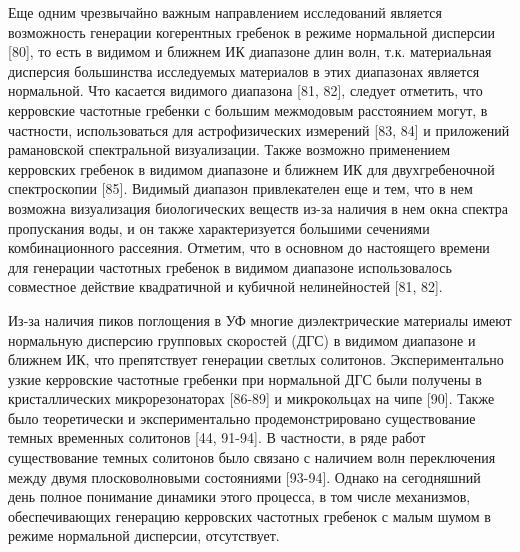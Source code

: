 Еще одним чрезвычайно важным направлением исследований является возможность генерации когерентных гребенок в режиме нормальной дисперсии [80], то есть в видимом и ближнем ИК диапазоне длин волн, т.к. материальная дисперсия большинства исследуемых материалов в этих диапазонах является нормальной. Что касается видимого диапазона [81, 82], следует отметить, что керровские частотные гребенки с большим межмодовым расстоянием могут, в частности, использоваться для астрофизических измерений [83, 84] и приложений рамановской спектральной визуализации. Также возможно применением керровских гребенок в видимом диапазоне и ближнем ИК для двухгребеночной спектроскопии [85]. Видимый диапазон привлекателен еще и тем, что в нем возможна визуализация биологических веществ из-за наличия в нем окна спектра пропускания воды, и он также характеризуется большими сечениями комбинационного рассеяния. Отметим, что в основном до настоящего времени для генерации частотных гребенок в видимом диапазоне использовалось совместное действие квадратичной и кубичной нелинейностей [81, 82].


Из-за наличия пиков поглощения в УФ многие диэлектрические материалы имеют нормальную дисперсию групповых скоростей (ДГС) в видимом диапазоне и ближнем ИК, что препятствует генерации светлых солитонов. Экспериментально узкие керровские частотные гребенки при нормальной ДГС были получены в кристаллических микрорезонаторах [86-89] и микрокольцах на чипе [90]. Также было теоретически и экспериментально продемонстрировано существование темных временных солитонов [44, 91-94]. В частности, в ряде работ существование темных солитонов было связано с наличием волн переключения между двумя плосковолновыми состояниями [93-94]. Однако на сегодняшний день полное понимание динамики этого процесса, в том числе механизмов, обеспечивающих генерацию керровских частотных гребенок с малым шумом в режиме нормальной дисперсии, отсутствует.


